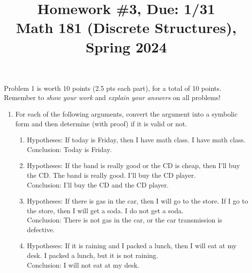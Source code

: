 \documentclass[11pt]{article}
\title{Homework \#3, Due: 1/31 \\Math 181 (Discrete Structures), Spring 2024}
\date{}
\begin{document}
\maketitle

\thispagestyle{empty}

\vspace{-1cm}

Problem 1 is worth 10 points (2.5 pts each part), for a total of 10 points. Remember to \emph{show your work} and \emph{explain your answers} on all problems!

\begin{enumerate}
\item For each of the following arguments, convert the argument into a symbolic form and then determine (with proof) if it is valid or not.
\begin{enumerate}
\item Hypotheses: If today is Friday, then I have math class. I have math class. \\ Conclusion: Today is Friday.
\item Hypotheses: If the band is really good or the CD is cheap, then I'll buy the CD. The band is really good. I'll buy the CD player. \\ Conclusion: I'll buy the CD and the CD player.
\item Hypotheses: If there is gas in the car, then I will go to the store. If I go to the store, then I will get a soda. I do not get a soda. \\ Conclusion: There is not gas in the car, or the car transmission is defective.
\item Hypotheses: If it is raining and I packed a lunch, then I will eat at my desk. I packed a lunch, but it is not raining. \\ Conclusion: I will not eat at my desk.
\end{enumerate}
\end{enumerate}
\end{document}
